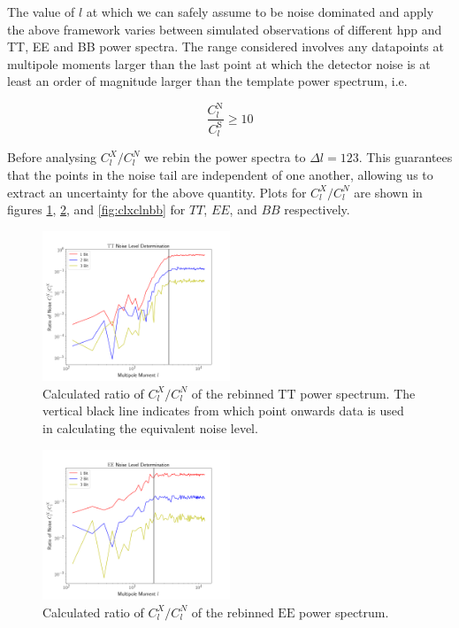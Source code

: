 \documentclass[apj]{emulateapj}
\begin{document}
The value of $l$ at which we can safely assume to be noise dominated and apply the above framework varies between simulated observations of different hpp and TT, EE and BB power spectra. The range considered involves any datapoints at multipole moments larger than the last point at which the detector noise is at least an order of magnitude larger than the template power spectrum, i.e.

\[ \frac{C_l^{\mathrm{N}}}{C_l^{\mathrm{S}}} \geq 10 \]

Before analysing $C_l^X/C_l^N$ we rebin the power spectra to $\Delta l = 123$. This guarantees that the points in the noise tail are independent of one another, allowing us to extract an uncertainty for the above quantity. Plots for $C_l^X/C_l^N$ are shown in figures \ref{fig:clxclntt}, \ref{fig:clxclnee}, and \ref{fig:clxclnbb} for $TT$, $EE$, and $BB$ respectively.

\begin{figure}[htb]\centering
\includegraphics[width=0.5\textwidth,clip]{Plots/ttratio.png}
  \caption[Current ]{
  Calculated ratio of $C_l^X/C_l^N$ of the rebinned $\mathrm{TT}$ power spectrum. The vertical black line indicates from which point onwards data is used in calculating the equivalent noise level.
           \label{fig:clxclntt}
  }
\end{figure}

\begin{figure}[htb]\centering
\includegraphics[width=0.5\textwidth,clip]{Plots/eeratio.png}
  \caption[Current ]{
  Calculated ratio of $C_l^X/C_l^N$ of the rebinned $\mathrm{EE}$ power spectrum.
\label{fig:clxclnee}
}
\end{figure}
\end{document}
